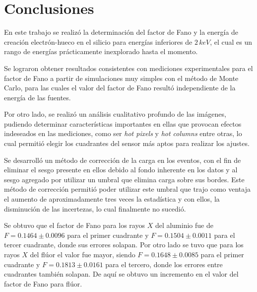 \chapter{Conclusiones}
\noindent En este trabajo se realizó la determinación del factor de Fano y la energía de creación electrón-hueco en el silicio para energías inferiores de $2\,\si{keV}$, el cual es un rango de energías prácticamente inexplorado hasta el momento.


Se lograron obtener resultados consistentes con mediciones experimentales para el factor de Fano a partir de simulaciones muy simples con el método de Monte Carlo, para las cuales el valor del factor de Fano resultó independiente de la energía de las fuentes.

Por otro lado, se realizó un análisis cualitativo profundo de las imágenes, pudiendo determinar características importantes en ellas que provocan efectos indeseados en las mediciones, como ser \textit{hot pixels} y \textit{hot columns} entre otras, lo cual permitió elegir los cuadrantes del sensor más aptos para realizar los ajustes.

Se desarrolló un método de corrección de la carga en los eventos, con el fin de eliminar el sesgo presente en ellos debido al fondo inherente en los datos y al sesgo agregado por utilizar un umbral que elimina carga sobre sus bordes. Este método de corrección permitió poder utilizar este umbral que trajo como ventaja el aumento de aproximadamente tres veces la estadística y con ellos, la disminución de las incertezas, lo cual finalmente no sucedió.

Se obtuvo que el factor de Fano para los rayos $X$ del aluminio fue de $F = 0.1464 \pm 0.0096$ para el primer cuadrante y $F = 0.1504 \pm 0.0011$ para el tercer cuadrante, donde sus errores solapan. Por otro lado se tuvo que para los rayos $X$ del flúor el valor fue mayor, siendo $F = 0.1648 \pm 0.0085$ para el primer cuadrante y $F = 0.1813 \pm 0.0161$ para el tercero, donde los errores entre cuadrantes también solapan. De aquí se obtuvo un incremento en el valor del factor de Fano para flúor.

